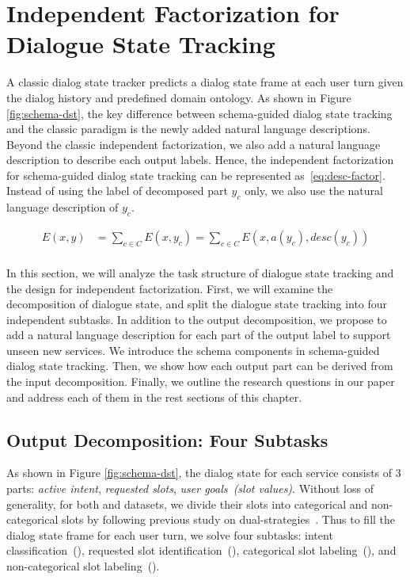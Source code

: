 
\section{Independent Factorization for Dialogue State Tracking}
\label{sec:sgd:ind-factorization}
A classic dialog state tracker predicts a dialog state frame at each
user turn given the dialog history and predefined domain ontology. As
shown in Figure \ref{fig:schema-dst}, the key difference between
schema-guided dialog state tracking and the classic paradigm is the
newly added natural language descriptions. Beyond the classic
independent factorization, we also add a natural language description
to describe each output labels. Hence, the independent factorization
for schema-guided dialog state tracking can be represented
as~\autoref{eq:desc-factor}. Instead of using the label of decomposed
part $y_{c}$ only, we also use the natural language description of
$y_{c}$.

\begin{equation}
    \label{eq:desc-factor}
    \begin{split}
    E(x, y) & =\sum_{c \in C} E(x, y_{c}) = \sum_{c \in C}E(x, a(y_{c}), desc(y_{c}))  \\
    \end{split}
\end{equation}



In this section, we will
analyze the task structure of dialogue state tracking and the design
for independent factorization. First, we will examine the
decomposition of dialogue state, and split the dialogue state tracking
into four independent subtasks. In addition to the output
decomposition, we propose to add a natural language description for
each part of the output label to support unseen new services. We
introduce the schema components in schema-guided dialog state
tracking. Then, we show how each output part can be derived from the
input decomposition. Finally, we outline the research questions in
our paper and address each of them in the rest sections of this
chapter.

\subsection{Output Decomposition: Four Subtasks}
\label{sec:sgd:decompose-y}
As shown in Figure \ref{fig:schema-dst}, the dialog state for each
service consists of 3 parts: {\it active intent}, {\it requested
  slots}, {\it user goals~(slot values)}. Without loss of generality,
for both \sgdst and \multiwoz datasets, we divide their slots into
categorical and non-categorical slots by following previous study on
dual-strategies~\cite{zhang2019find}. Thus to fill the dialog state
frame for each user turn, we solve four  subtasks:
intent classification~(\IC), requested slot identification~(\RSI),
categorical slot labeling~(\CSL), and non-categorical slot
labeling~(\NSL).

